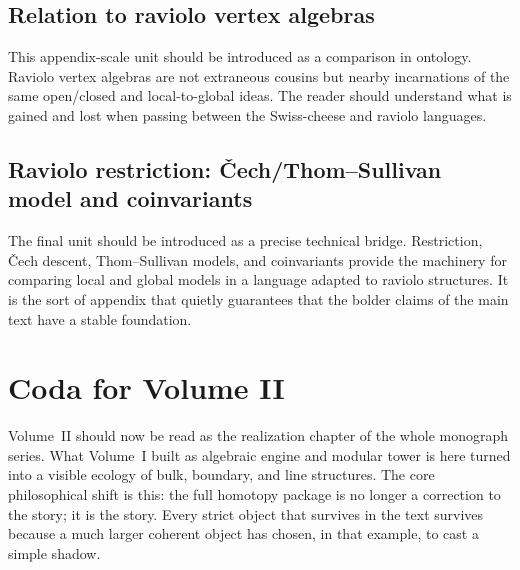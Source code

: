 \subsection*{Relation to raviolo vertex algebras}
This appendix-scale unit should be introduced as a comparison in ontology.  Raviolo vertex algebras are not extraneous cousins but nearby incarnations of the same open/closed and local-to-global ideas.  The reader should understand what is gained and lost when passing between the Swiss-cheese and raviolo languages.

\subsection*{Raviolo restriction: Čech/Thom--Sullivan model and coinvariants}
The final unit should be introduced as a precise technical bridge.  Restriction, Čech descent, Thom--Sullivan models, and coinvariants provide the machinery for comparing local and global models in a language adapted to raviolo structures.  It is the sort of appendix that quietly guarantees that the bolder claims of the main text have a stable foundation.

\section*{Coda for Volume II}
Volume~II should now be read as the realization chapter of the whole monograph series.  What Volume~I built as algebraic engine and modular tower is here turned into a visible ecology of bulk, boundary, and line structures.  The core philosophical shift is this: the full homotopy package is no longer a correction to the story; it is the story.  Every strict object that survives in the text survives because a much larger coherent object has chosen, in that example, to cast a simple shadow.
